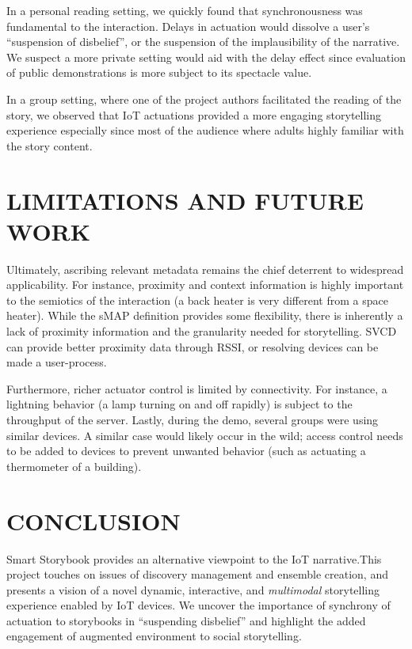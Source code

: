 \documentclass{sigchi}
\begin{document}
In a personal reading setting, we quickly found that synchronousness was fundamental to the interaction. Delays in actuation would dissolve a user's ``suspension of disbelief'', or the suspension of the implausibility of the narrative. We suspect a more private setting would aid with the delay effect since evaluation of public demonstrations is more subject to its spectacle value. 

In a group setting, where one of the project authors facilitated the reading of the story, we observed that IoT actuations provided a more engaging storytelling experience especially since most of the audience where adults highly familiar with the story content. 




\section{LIMITATIONS AND FUTURE WORK}
Ultimately, ascribing relevant metadata remains the chief deterrent to widespread applicability. For instance, proximity and context information is highly important to the semiotics of the interaction (a back heater is very different from a space heater). 
While the sMAP definition provides some flexibility, there is inherently a lack of proximity information and the granularity needed for storytelling. SVCD can provide better proximity data through RSSI, or resolving devices can be made a user-process.

Furthermore, richer actuator control is limited by connectivity. For instance, a lightning behavior (a lamp turning on and off rapidly) is subject to the throughput of the server.
Lastly, during the demo, several groups were using similar devices. A similar case would likely occur in the wild; access control needs to be added to devices to prevent unwanted behavior (such as actuating a thermometer of a building). 

\section{CONCLUSION}
Smart Storybook provides an alternative viewpoint to the IoT narrative.This project touches on issues of discovery management and ensemble creation, and presents a vision of a novel dynamic, interactive, and \textit{multimodal} storytelling experience enabled by IoT devices. We uncover the importance of synchrony of actuation to storybooks in ``suspending disbelief'' and highlight the added engagement of augmented environment to social storytelling. 
\end{document}
